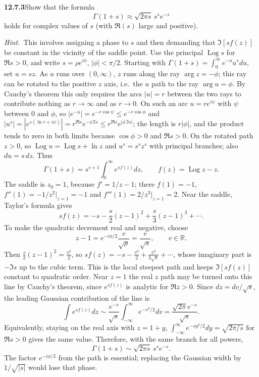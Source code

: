 \par\bigskip
\noindent\textbf{12.7.3}\quad Show that the formula
\[
\Gamma(1+s)\approx\sqrt{2\pi s}\,s^{s}e^{-s}
\]
holds for complex values of $s$ (with $\Re(s)$ large and positive).

\emph{Hint.}~This involves assigning a phase to $s$ and then demanding that
$\Im[sf(z)]$ be constant in the vicinity of the saddle point.
\solution
Use the principal $\operatorname{Log}s$ for $\Re s>0$, and write
$s=\rho e^{i\phi}$, $|\phi|<\pi/2$.
Starting with $\Gamma(1+s)=\int_0^\infty e^{-u}u^sdu$, set $u=sz$.
As $u$ runs over $(0,\infty)$, $z$ runs along the ray $\arg z=-\phi$;
this ray can be rotated to the positive $z$ axis, i.e.\ the $u$ path to
the ray $\arg u=\phi$. By Cauchy's theorem this only requires the arcs
$|u|=r$ between the two rays to contribute nothing as
$r\to\infty$ and as $r\to0$. On such an arc $u=re^{i\psi}$ with $\psi$
between $0$ and $\phi$, so $|e^{-u}|=e^{-r\cos\psi}\le e^{-r\cos\phi}$
and $|u^s|=|e^{s(\ln r+i\psi)}|=r^{\Re s}e^{-\psi\Im s}
\le r^{\Re s}e^{|\phi\,\Im s|}$; the length is $r|\phi|$, and the
product tends to zero in both limits because $\cos\phi>0$ and
$\Re s>0$.
On the rotated path $z>0$, so $\operatorname{Log}u=\operatorname{Log}s+
\ln z$ and $u^s=s^sz^s$ with principal branches; also $du=s\,dz$. Thus
\[
\Gamma(1+s)=s^{s+1}\int_0^\infty e^{s f(z)}dz,\qquad
f(z)=\operatorname{Log}z-z.
\]
The saddle is $z_0=1$, because $f'=1/z-1$; there
$f(1)=-1$, $f''(1)=-1/z^2|_{z=1}=-1$ and $f'''(1)=2/z^3|_{z=1}=2$.
Near the saddle, Taylor's formula gives
\[
sf(z)=-s-\frac s2(z-1)^2+\frac s3(z-1)^3+\cdots.
\]
To make the quadratic decrement real and negative, choose
\[
z-1=e^{-i\phi/2}\frac{v}{\sqrt\rho}=\frac v{\sqrt s},\qquad v\in\mathbb R.
\]
Then $\frac s2(z-1)^2=\frac{v^2}2$, so
$sf(z)=-s-\frac{v^2}2+\frac{v^3}{3\sqrt s}+\cdots$, whose imaginary
part is $-\Im s$ up to the cubic term.
This is the local steepest path and keeps $\Im[sf(z)]$ constant to
quadratic order. Near $z=1$ the real $z$ path may be turned onto this
line by Cauchy's theorem, since $e^{sf(z)}$ is analytic for $\Re z>0$.
Since $dz=dv/\sqrt s$, the leading Gaussian contribution of the line is
\[
\int e^{sf(z)}dz
\sim\frac{e^{-s}}{\sqrt s}\int_{-\infty}^{\infty}e^{-v^2/2}dv
=\frac{\sqrt{2\pi}e^{-s}}{\sqrt s}.
\]
Equivalently, staying on the real axis with $z=1+y$,
$\int_{-\infty}^{\infty}e^{-sy^2/2}dy=\sqrt{2\pi/s}$ for $\Re s>0$
gives the same value.
Therefore, with the same branch for all powers,
\[
\boxed{\Gamma(1+s)\sim\sqrt{2\pi s}\,s^s e^{-s}}.
\]
The factor $e^{-i\phi/2}$ from the path is essential; replacing the
Gaussian width by $1/\sqrt{|s|}$ would lose that phase.

